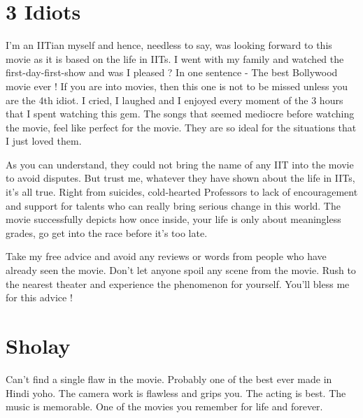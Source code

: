 \documentclass{article}
\begin{document}
\section{3 Idiots}
	
I'm an IITian myself and hence, needless to say, was looking forward to this movie as it is based on the life in IITs. I went with my family and watched the first-day-first-show and was I pleased ? In one sentence - The best Bollywood movie ever ! If you are into movies, then this one is not to be missed unless you are the 4th idiot. I cried, I laughed and I enjoyed every moment of the 3 hours that I spent watching this gem. The songs that seemed mediocre before watching the movie, feel like perfect for the movie. They are so ideal for the situations that I just loved them.

As you can understand, they could not bring the name of any IIT into the movie to avoid disputes. But trust me, whatever they have shown about the life in IITs, it's all true. Right from suicides, cold-hearted Professors to lack of encouragement and support for talents who can really bring serious change in this world. The movie successfully depicts how once inside, your life is only about meaningless grades, go get into the race before it's too late.

Take my free advice and avoid any reviews or words from people who have already seen the movie. Don't let anyone spoil any scene from the movie. Rush to the nearest theater and experience the phenomenon for yourself. You'll bless me for this advice !

\section{Sholay}
Can't find a single flaw in the movie. Probably one of the best ever made in Hindi yoho. The camera work is flawless and grips you. The acting is best. The music is memorable. One of the movies you remember for life and forever.
\end{document}
